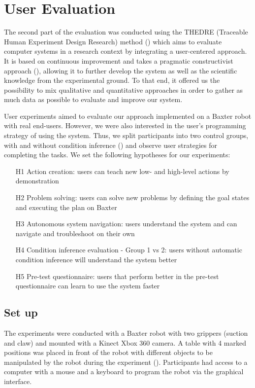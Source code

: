 
\section{User Evaluation}
\label{sec:quanteval}
The second part of the evaluation was conducted using the THEDRE (Traceable Human Experiment Design Research) method (\cite{mandran2018traceable,mandran2017thedre}) which aims to evaluate computer systems in a research context by integrating a user-centered approach.
It is based on continuous improvement and takes a pragmatic constructivist approach (\cite{avenier2015finding}), allowing it to further develop the system as well as the scientific knowledge from the experimental ground.
To that end, it offered us the possibility to mix qualitative and quantitative approaches in order to gather as much data as possible to evaluate and improve our system. 

User experiments aimed to evaluate our approach implemented on a Baxter robot with real end-users.
However, we were also interested in the user's programming strategy of using the system.
Thus, we split participants into two control groups, with and without condition inference () and observe user strategies for completing the tasks.
We set the following hypotheses for our experiments:
\begin{enumerate}
    \item[H1] Action creation: users can teach new low- and high-level actions by demonstration
    \item[H2] Problem solving: users can solve new problems by defining the goal states and executing the plan on Baxter
    \item[H3] Autonomous system navigation: users understand the system and can navigate and troubleshoot on their own
    \item[H4] Condition inference evaluation - Group 1 vs 2: users without automatic condition inference will understand the system better
    \item[H5] Pre-test questionnaire: users that perform better in the pre-test questionnaire can learn to use the system faster
\end{enumerate}

\subsection{Set up}
The experiments were conducted with a Baxter robot with two grippers (suction and claw) and mounted with a Kinect Xbox 360 camera. 
A table with 4 marked positions was placed in front of the robot with different objects to be manipulated by the robot during the experiment ().
Participants had access to a computer with a mouse and a keyboard to program the robot via the graphical interface.

